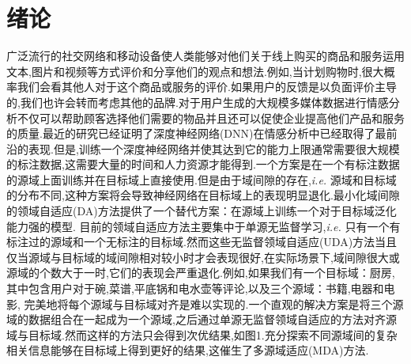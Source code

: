 
\chapter{绪论}
\label{chpt:introduction}


广泛流行的社交网络和移动设备使人类能够对他们关于线上购买的商品和服务运用文本,图片和视频等方式评价和分享他们的观点和想法\cite{zhao2015predicting,zhao2016predicting,deriu2017leveraging,gong2017clustered,luiz2018feature,gong2018sentiment,zhao2020discrete,zhao2020end}.例如,当计划购物时,很大概率我们会看其他人对于这个商品或服务的评价.如果用户的反馈是以负面评价主导的,我们也许会转而考虑其他的品牌.对于用户生成的大规模多媒体数据进行情感分析不仅可以帮助顾客选择他们需要的物品并且还可以促使企业提高他们产品和服务的质量\cite{zhao2016predicting,chen2019emoji}.最近的研究\cite{zhang2018textual,kiritchenko2014sentiment,georgakopoulos2018convolutional,liu2018content,yadav2020sentiment,wang2018sentiment,wang2019aspect,chen2019emoji,biddle2020leveraging}已经证明了深度神经网络(DNN)在情感分析中已经取得了最前沿的表现.但是,训练一个深度神经网络并使其达到它的能力上限通常需要很大规模的标注数据,这需要大量的时间和人力资源才能得到.一个方案是在一个有标注数据的源域上面训练并在目标域上直接使用.但是由于域间隙的存在\cite{torralba2011unbiased},\textit{i.e.} 源域和目标域的分布不同,这种方案将会导致神经网络在目标域上的表现明显退化\cite{tzeng2015simultaneous,hoffman2018cycada,yue2019domain,yang2020curriculum}.最小化域间隙的领域自适应(DA)\cite{patel2015visual,sun2015survey,kouw2019review,zhao2020multi,zhao2020review}方法提供了一个替代方案：在源域上训练一个对于目标域泛化能力强的模型.
目前的领域自适应方法主要集中于单源无监督学习\cite{liu2019survey,xi2020domain},\textit{i.e.} 只有一个有标注过的源域和一个无标注的目标域.然而这些无监督领域自适应(UDA)方法当且仅当源域与目标域的域间隙相对较小时才会表现很好,在实际场景下,域间隙很大或源域的个数大于一时,它们的表现会严重退化\cite{guo2018multi,zhao2020multi}.例如,如果我们有一个目标域：厨房,其中包含用户对于碗,菜谱,平底锅和电水壶等评论,以及三个源域：书籍,电器和电影, 完美地将每个源域与目标域对齐是难以实现的.一个直观的解决方案是将三个源域的数据组合在一起成为一个源域,之后通过单源无监督领域自适应的方法对齐源域与目标域.然而这样的方法只会得到次优结果,如图1.充分探索不同源域间的复杂相关信息能够在目标域上得到更好的结果,这催生了多源域适应(MDA)方法\cite{sun2015survey,zhao2020multi}.
